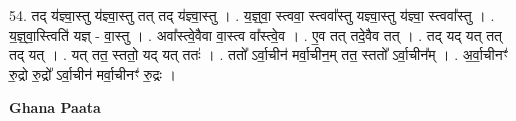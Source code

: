 \documentclass[17pt]{extarticle}
\begin{document}
54. तद् य॑ज्ञ्वा॒स्तु य॑ज्ञ्वा॒स्तु तत् तद् य॑ज्ञ्वा॒स्तु । . य॒ज्ञ्॒वा॒ स्त्ववा॒ स्त्ववा᳚स्तु यज्ञ्वा॒स्तु य॑ज्ञ्वा॒ स्त्ववा᳚स्तु । . य॒ज्ञ्॒वा॒स्त्विति॑ यज्ञ् - वा॒स्तु । . अवा᳚स्त्वे॒वैवा वा॒स्त्व वा᳚स्त्वे॒व । . ए॒व तत् तदे॒वैव तत् । . तद् यद् यत् तत् तद् यत् । . यत् तत॒ स्ततो॒ यद् यत् ततः॑ । . ततो᳚ ऽर्वा॒चीन॑ मर्वा॒चीन॒म् तत॒ स्ततो᳚ ऽर्वा॒चीन᳚म् । . अ॒र्वा॒चीनꣳ॑ रु॒द्रो रु॒द्रो᳚ ऽर्वा॒चीन॑ मर्वा॒चीनꣳ॑ रु॒द्रः । \newline

\textbf{Ghana Paata } \newline
\end{document}
